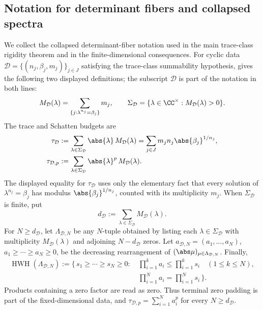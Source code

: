 \subsection{Notation for determinant fibers and collapsed spectra}

We collect the collapsed determinant-fiber notation used in the main
trace-class rigidity theorem and in the finite-dimensional consequences.
For cyclic data
\(\mathcal D=\{(n_j,\beta_j,m_j)\}_{j\in J}\) satisfying the trace-class
summability hypothesis,  gives the
following two displayed definitions; the subscript \(\mathcal D\) is part of the
notation in both lines:
\[
  M_{\mathcal D}(\lambda)
  =\sum_{\{j:\lambda^{n_j}=\beta_j\}}m_j,
  \qquad
  \Sigma_{\mathcal D}=\{\lambda\in\CC^\times:
  M_{\mathcal D}(\lambda)>0\}.
\]
The trace and Schatten budgets are
\[
\begin{aligned}
  \tau_{\mathcal D}
  &:=\sum_{\lambda\in\Sigma_{\mathcal D}}
    \abs{\lambda}\, M_{\mathcal D}(\lambda)
    =\sum_{j\in J}m_jn_j\abs{\beta_j}^{1/n_j},\\
  \tau_{\mathcal D,p}
  &:=\sum_{\lambda\in\Sigma_{\mathcal D}}
    \abs{\lambda}^{p}\, M_{\mathcal D}(\lambda).
\end{aligned}
\]
The displayed equality for \(\tau_{\mathcal D}\) uses only the elementary fact
that every solution of \(\lambda^{n_j}=\beta_j\) has modulus
\(\abs{\beta_j}^{1/n_j}\), counted with its multiplicity \(m_j\).
When \(\Sigma_{\mathcal D}\) is finite, put
\[
  d_{\mathcal D}:=\sum_{\lambda\in\Sigma_{\mathcal D}}
    M_{\mathcal D}(\lambda).
\]
For \(N\ge d_{\mathcal D}\), let \(\Lambda_{\mathcal D,N}\) be any
\(N\)-tuple obtained by listing each \(\lambda\in\Sigma_{\mathcal D}\) with
multiplicity \(M_{\mathcal D}(\lambda)\) and adjoining
\(N-d_{\mathcal D}\) zeros.  Let
\(a_{\mathcal D,N}=(a_1,\ldots,a_N)\), \(a_1\ge\cdots\ge a_N\ge0\), be the
decreasing rearrangement of \((\abs\mu)_{\mu\in\Lambda_{\mathcal D,N}}\).
Finally,
\[
\begin{split}
  \operatorname{HWH}(\Lambda_{\mathcal D,N})
  :=\{\,s_1\ge\cdots\ge s_N\ge0:
  &\ \prod_{i=1}^k a_i\le\prod_{i=1}^k s_i\quad(1\le k\le N),\\
  &\ \prod_{i=1}^N a_i=\prod_{i=1}^N s_i\,\}.
\end{split}
\]
Products containing a zero factor are read as zero.  Thus terminal zero
padding is part of the fixed-dimensional data, and
\(\tau_{\mathcal D,p}=\sum_{i=1}^N a_i^p\) for every \(N\ge d_{\mathcal D}\).

